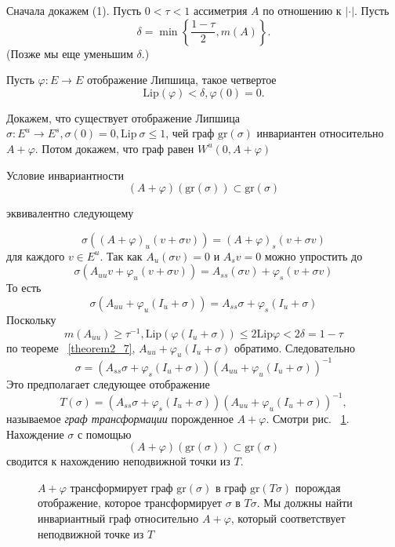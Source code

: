 \begin{demo}
Сначала докажем (1). Пусть $0 < \tau < 1$ ассиметрия $A$ по отношению к $|\cdot|$. Пусть 
$$
\delta = \min \left\{ \frac{1-\tau}{2}, m(A) \right\}.
$$
(Позже мы еще уменьшим $\delta$.)

Пусть $\varphi: E \rightarrow E$ отображение Липшица, такое четвертое
$$
\mathrm{Lip}(\varphi) < \delta, \varphi(0)=0.
$$

Докажем, что существует отображение Липшица $\sigma: E^u \rightarrow E^s, \sigma(0)=0, \mathrm{Lip} \ \sigma \leqslant 1$, чей граф $\mathrm{gr}(\sigma)$ инвариантен относительно $A+\varphi$. Потом докажем, что граф равен $W^u(0,A+ \varphi)$

Условие инвариантности 
$$
(A+\varphi)(\mathrm{gr}(\sigma)) \subset \mathrm{gr}(\sigma)
$$

эквивалентно следующему

$$
\sigma ((A+\varphi)_u(v+\sigma v)) = (A+\varphi)_s(v+\sigma v)
$$
для каждого $v \in E^u$. Так как $A_u(\sigma v)=0$ и $A_s v=0$ можно упростить до 
$$
\sigma (A_{uu}v+\varphi_u(v+\sigma v)) = A_{ss}(\sigma v)+\varphi_s(v + \sigma v)
$$
То есть 
$$
\sigma(A_{uu}+\varphi_u(I_u+\sigma)) = A_{ss}\sigma + \varphi_s(I_u+\sigma)
$$
Поскольку 
$$
m(A_{uu}) \geqslant \tau^{-1}, \mathrm{Lip}(\varphi(I_u+\sigma)) \leqslant 2 \mathrm{Lip} \varphi < 2\delta = 1-\tau
$$
по теореме ~\ref{theorem2_7}, $A_{uu}+\varphi_u(I_u + \sigma)$ обратимо. Следовательно
$$
\sigma = (A_{ss}\sigma+\varphi_s(I_u+\sigma))(A_{uu} + \varphi_u(I_u+\sigma))^{-1}
$$  
Это предполагает следующее отображение
$$
T(\sigma)=(A_{ss}\sigma + \varphi_s(I_u+\sigma))(A_{uu} + \varphi_u(I_u+\sigma))^{-1},
$$
называемое \textit{граф трансформации} порожденное $A+\varphi$. Смотри рис. ~\ref{picture2_10}. Нахождение $\sigma$ с помощью 
$$
(A+\varphi)(\mathrm{gr}(\sigma)) \subset \mathrm{gr}(\sigma)
$$
сводится к нахождению неподвижной точки из $T$.
\\
\begin{figure}[h]
\begin{center}
\begin{minipage}{.85\textwidth}
\begin{center}
\caption{$A + \varphi$ трансформирует граф $\mathrm{gr}(\sigma)$ в граф $\mathrm{gr}(T\sigma)$ порождая отображение, которое трансформирует $\sigma$ в $T\sigma$. Мы должны найти инвариантный граф относительно $A+\varphi$, который соответствует неподвижной точке из $T$ }
\label{picture2_10}
\end{center}
\end{minipage}
\end{center}
\end{figure}


\end{demo}

